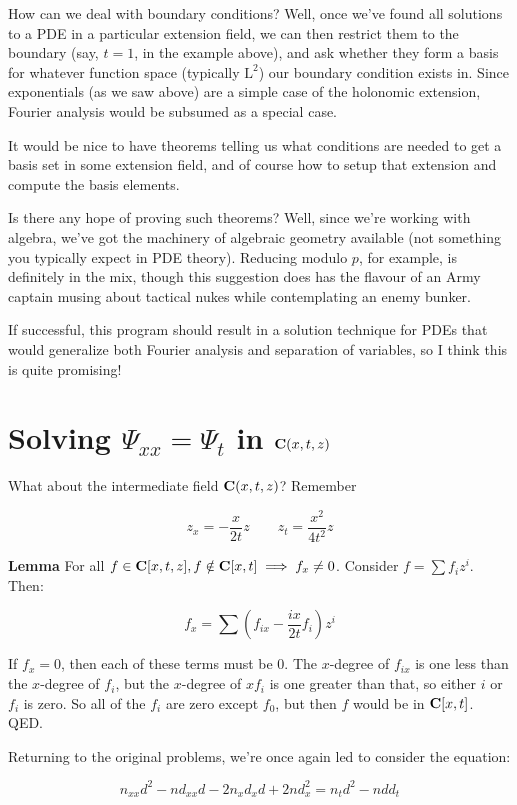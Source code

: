 \documentclass{article}
\newcommand{\C}{\ensuremath{{\bf C}}}
\begin{document}
How can we deal with boundary conditions?  Well, once we've found all
solutions to a PDE in a particular extension field, we can then
restrict them to the boundary (say, $t=1$, in the example above), and
ask whether they form a basis for whatever function space (typically
$\text{L}^2$) our boundary condition exists in.  Since exponentials
(as we saw above) are a simple case of the holonomic extension,
Fourier analysis would be subsumed as a special case.

It would be nice to have theorems telling us what conditions are
needed to get a basis set in some extension field, and of course how
to setup that extension and compute the basis elements.

Is there any hope of proving such theorems?  Well, since we're working
with algebra, we've got the machinery of algebraic geometry available
(not something you typically expect in PDE theory).  Reducing modulo
$p$, for example, is definitely in the mix, though this suggestion
does has the flavour of an Army captain musing about tactical nukes
while contemplating an enemy bunker.

If successful, this program should result in a solution technique for
PDEs that would generalize both Fourier analysis and separation of
variables, so I think this is quite promising!


\vfill\eject
\section*{Solving $\Psi_{xx}=\Psi_t$ in $\C(x,t,z)$}

What about the intermediate field $\C(x,t,z)$?  Remember

$$z_x = -\frac{x}{2t} z \qquad z_t = \frac{x^2}{4t^2} z$$

{\bf Lemma}  For all $f \in \C[x,t,z], f \notin \C[x,t] \implies f_x \ne 0$.
Consider $f = \sum f_i z^i$.  Then:

$$f_x = \sum \left( f_{ix} - \frac{ix}{2t} f_i \right) z^i$$

If $f_x = 0$, then each of these terms must be 0.  The $x$-degree of $f_{ix}$
is one less than the $x$-degree of $f_i$, but the $x$-degree of $xf_i$ is
one greater than that, so either $i$ or $f_i$ is zero.  So all of the $f_i$
are zero except $f_0$, but then $f$ would be in $\C[x,t]$.  QED.

Returning to the original problems, we're once again led to consider the equation:

$$n_{xx} d^2 - n d_{xx} d - 2 n_{x}d_{x}d + 2nd_x^2 = n_t d^2 - n d d_t$$
\end{document}
